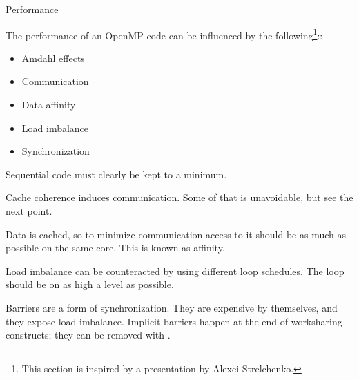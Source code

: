  {Performance}


The performance of an OpenMP code can be influenced by the following\footnote
{This section is inspired by a presentation by Alexei Strelchenko.}::
\begin{itemize}
\item Amdahl effects
\item Communication
\item Data affinity
\item Load imbalance
\item Synchronization
\end{itemize}

Sequential code must clearly be kept to a minimum.

Cache coherence induces communication. Some of that is unavoidable,
but see the next point.

Data is cached, so to minimize communication
access to it should be as much as possible
on the same core. This is known as affinity.

Load imbalance can be counteracted by using
different loop schedules. The loop should be
on as high a level as possible.

Barriers are a form of synchronization.
They are expensive by themselves, and they
expose load imbalance. Implicit barriers happen
at the end of worksharing constructs; they
can be removed with .




\endinput

\Level 0 {Idioms}

\Level 1 {While loops}

\verbatimsnippet{linkedlist}

